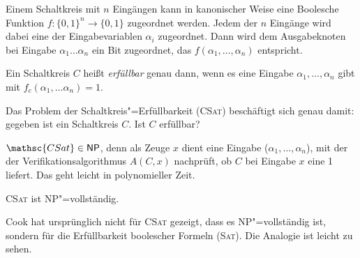 Einem Schaltkreis mit $n$ Eingängen kann in kanonischer Weise eine Boolesche Funktion $f : \{0,1\}^n \to \{0,1\}$ zugeordnet werden. Jedem der $n$ Eingänge wird dabei eine der Eingabevariablen $\alpha_i$ zugeordnet. Dann wird dem Ausgabeknoten bei Eingabe $\alpha_1 \ldots \alpha_n$ ein Bit zugeordnet, das $f(\alpha_1, \ldots, \alpha_n)$ entspricht.

\begin{Def}
  \hspace{\parindent}Ein Schaltkreis $C$ heißt \textit{erfüllbar} genau dann, wenn es eine Eingabe $\alpha_1, \ldots, \alpha_n$ gibt mit $f_c(\alpha_1, \ldots \alpha_n) = 1$.
\end{Def}

Das Problem der Schaltkreis"=Erfüllbarkeit (\textsc{CSat}) beschäftigt sich genau damit: gegeben ist ein Schaltkreis $C$. Ist $C$ erfüllbar?

$\mathsc{CSat} \in \mathsf{NP}$, denn als Zeuge $x$ dient eine Eingabe ($\alpha_1, \ldots, \alpha_n$), mit der der Verifikationsalgorithmus $A(C,x)$ nachprüft, ob $C$ bei Eingabe $x$ eine 1 liefert. Das geht leicht in polynomieller Zeit.

\begin{Satz}[Cook, 1970]
  \hspace{\parindent}\textsc{CSat} ist \textsf{NP}"=vollständig.
\end{Satz}

\begin{Bem}
  \hspace{\parindent}Cook hat ursprünglich nicht für \textsc{CSat} gezeigt, dass es \textsf{NP}"=vollständig ist, sondern für die Erfüllbarkeit boolescher Formeln (\textsc{Sat}). Die Analogie ist leicht zu sehen.
\end{Bem}

